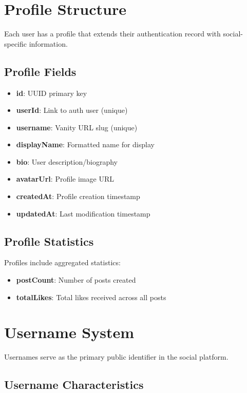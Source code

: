 \documentclass[12pt,a4paper]{report}
\begin{document}
\section{Profile Structure}

Each user has a profile that extends their authentication record with social-specific information.

\subsection{Profile Fields}

\begin{itemize}
    \item \textbf{id}: UUID primary key
    \item \textbf{userId}: Link to auth user (unique)
    \item \textbf{username}: Vanity URL slug (unique)
    \item \textbf{displayName}: Formatted name for display
    \item \textbf{bio}: User description/biography
    \item \textbf{avatarUrl}: Profile image URL
    \item \textbf{createdAt}: Profile creation timestamp
    \item \textbf{updatedAt}: Last modification timestamp
\end{itemize}

\subsection{Profile Statistics}

Profiles include aggregated statistics:
\begin{itemize}
    \item \textbf{postCount}: Number of posts created
    \item \textbf{totalLikes}: Total likes received across all posts
\end{itemize}

\section{Username System}

Usernames serve as the primary public identifier in the social platform.

\subsection{Username Characteristics}
\end{document}
